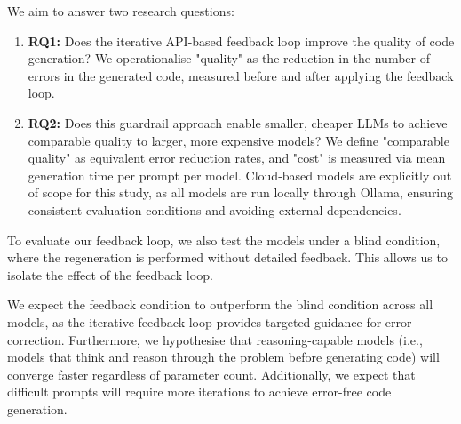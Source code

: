 


We aim to answer two research questions:

\begin{enumerate}
	\item \textbf{RQ1:} Does the iterative API-based feedback loop improve the quality of code generation? We operationalise "quality" as the reduction in the number of errors in the generated code, measured before and after applying the feedback loop. 
	\item \textbf{RQ2:} Does this guardrail approach enable smaller, cheaper LLMs to achieve comparable quality to larger, more expensive models? We define "comparable quality" as equivalent error reduction rates, and "cost" is measured via mean generation time per prompt per model. Cloud-based models are explicitly out of scope for this study, as all models are run locally through Ollama, ensuring consistent evaluation conditions and avoiding external dependencies.
\end{enumerate}







To evaluate our feedback loop, we also test the models under a blind condition, where the regeneration is performed without detailed feedback. This allows us to isolate the effect of the feedback loop. 

We expect the feedback condition to outperform the blind condition across all models, as the iterative feedback loop provides targeted guidance for error correction. Furthermore, we hypothesise that reasoning-capable models (i.e., models that think and reason through the problem before generating code) will converge faster regardless of parameter count. Additionally, we expect that difficult prompts will require more iterations to achieve error-free code generation.
